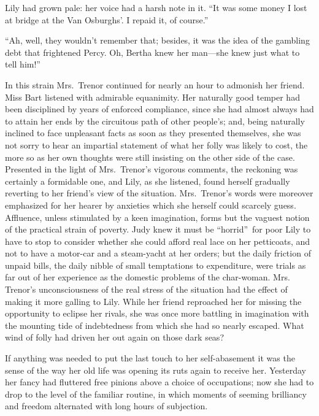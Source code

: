 \documentclass[12pt,a4paper]{book}
\begin{document}
Lily had grown pale: her voice had a harsh note in it. ``It was
some money I lost at bridge at the Van Osburghs'. I repaid it, of
course.''





``Ah, well, they wouldn't remember that; besides, it was the idea
of the gambling debt that frightened Percy. Oh, Bertha knew her
man---she knew just what to tell him!''





In this strain Mrs.\ Trenor continued for nearly an hour to
admonish her friend. Miss Bart listened with admirable
equanimity. Her naturally good temper had been disciplined by
years of enforced compliance, since she had almost always had to
attain her ends by the circuitous path of other people's; and,
being naturally inclined to face unpleasant facts as soon as they
presented themselves, she was not sorry to hear an impartial
statement of what her folly was likely to cost, the more so as
her own thoughts were still insisting on the other side of the
case. Presented in the light of Mrs.\ Trenor's vigorous comments,
the reckoning was certainly a formidable one, and Lily, as she
listened, found herself gradually reverting to her friend's view
of the situation. Mrs.\ Trenor's words were moreover emphasized
for her hearer by anxieties which she herself could scarcely
guess. Affluence, unless stimulated by a keen imagination, forms
but the vaguest notion of the practical strain of poverty. Judy
knew it must be ``horrid''\ for poor Lily to have to stop to
consider whether she could afford real lace on her petticoats,
and not to have a motor-car and a steam-yacht at her orders; but
the daily friction of unpaid bills, the daily nibble of small
temptations to expenditure, were trials as far out of her
experience as the domestic problems of the char-woman. Mrs.
Trenor's unconsciousness of the real stress of the situation had
the effect of making it more galling to Lily. While her friend
reproached her for missing the opportunity to eclipse her rivals,
she was once more battling in imagination with the mounting tide
of indebtedness from which she had so nearly escaped. What wind
of folly had driven her out again on those dark seas?





If anything was needed to put the last touch to her
self-abasement it was the sense of the way her old life was
opening its ruts again to receive her. Yesterday her fancy had
fluttered free pinions above a choice of occupations; now she had
to drop to the level of the familiar routine, in which moments of
seeming brilliancy and freedom alternated with long hours of
subjection.
\end{document}
